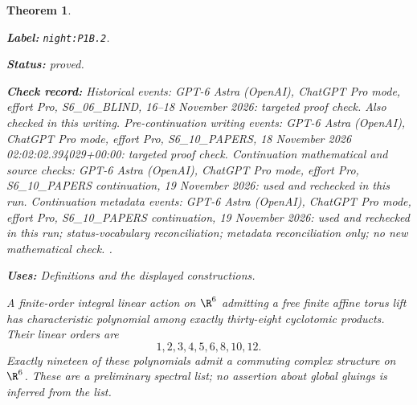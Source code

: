 \documentclass[11pt,a4paper]{article}
\newtheorem{theorem}{Theorem}[section]
\theoremstyle{definition}
\newcommand{\StatementRecord}[4]{\par\smallskip\begingroup\upshape\raggedright\noindent\textbf{Label:} \nolinkurl{#1}.\par\noindent\textbf{Status:} #2.\par\noindent\textbf{Check record:} #3.\par\noindent\textbf{Uses:} #4.\par\endgroup\smallskip}
\begin{document}
\begin{theorem}\label{night:P1B.2}
\StatementRecord{night:P1B.2}{proved}{Historical events: GPT-6 Astra (OpenAI), ChatGPT Pro mode, effort Pro, S6\_06\_BLIND, 16--18 November 2026: targeted proof check. Also checked in this writing. Pre-continuation writing events: GPT-6 Astra (OpenAI), ChatGPT Pro mode, effort Pro, S6\_10\_PAPERS, 18 November 2026 02:02:02.394029+00:00: targeted proof check. Continuation mathematical and source checks: GPT-6 Astra (OpenAI), ChatGPT Pro mode, effort Pro, S6\_10\_PAPERS continuation, 19 November 2026: used and rechecked in this run. Continuation metadata events: GPT-6 Astra (OpenAI), ChatGPT Pro mode, effort Pro, S6\_10\_PAPERS continuation, 19 November 2026: used and rechecked in this run; status-vocabulary reconciliation; metadata reconciliation only; no new mathematical check. }{Definitions and the displayed constructions}
A finite-order integral linear action on $\R^6$ admitting a
free finite affine torus lift has characteristic polynomial
among exactly thirty-eight cyclotomic products. Their linear
orders are
\[
 1,2,3,4,5,6,8,10,12.
\]
Exactly nineteen of these polynomials admit a commuting complex
structure on $\R^6$. These are a preliminary spectral list;
no assertion about global gluings is inferred from the list.
\end{theorem}
\end{document}
